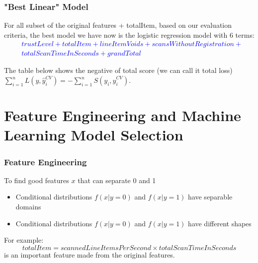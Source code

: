 \documentclass{beamer}
\begin{document}
\begin{frame}
\frametitle{"Best Linear" Model}
{\small
For all subset of the original features + totalItem,  based on our evaluation criteria, the best model we have now is the logistic regression model with 6 terms:
\textcolor{blue}{
\begin{align*}
& trustLevel + totalItem + lineItemVoids + scansWithoutRegistration +\\
& totalScanTimeInSeconds + grandTotal 
\end{align*}
}

The table below shows the negative of total score (we can call it total loss) $\sum_{i=1}^n L(y, \hat{y}_i^{CV}) = - \sum_{i=1}^n S(y_i, \hat{y}_i^{CV})$.

\begin{table}[H]
\end{table}
}


\end{frame}



\section{Feature Engineering and Machine Learning Model Selection}

\begin{frame}
\frametitle{Feature Engineering}
    To find good features $x$ that can separate 0 and 1
    \begin{itemize}
        \item Conditional distributions $f(x|y=0)$ and $f(x|y=1)$ have separable domains
        \item Conditional distributions $f(x|y=0)$ and $f(x|y=1)$ have different shapes
    \end{itemize}
    For example:
    \[totalItem = scannedLineItemsPerSecond \times totalScanTimeInSeconds \]
    is an important feature made from the original features.
    
\end{frame}
\end{document}

